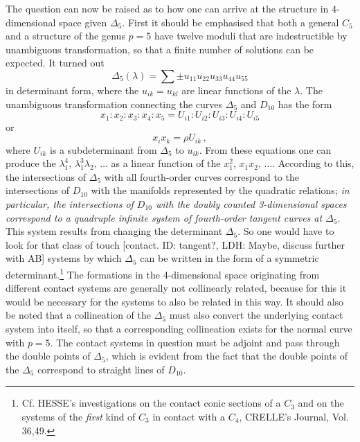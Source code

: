 \documentclass[leqno]{article}
\begin{document}
 The question can now be raised as to how one can arrive at the structure in 4-dimensional space given $\Delta_5$. First it should be emphasised that both a general $C_5$ and a structure of the genus $p=5$ have twelve moduli that are indestructible by unambiguous transformation, so that a finite number of solutions can be expected. It turned out
\[
\Delta_5(\lambda) = \sum \pm u_{11} u_{22} u_{33} u_{44} u_{55}
\] 
in determinant form, where the $u_{ik}=u_{kl}$ are linear functions of the $\lambda$. The unambiguous transformation connecting the curves $\Delta_5$ and $D_{10}$ has the form 
\[
x_1 : x_2 : x_3 : x_4 : x_5 = U_{i1} : U_{i2} : U_{i3} : U_{i4} : U_{i5}
\] 
or 
\[
x_i x_k = \rho U_{ik} \, , 
\] 
where $U_{ik}$ is a subdeterminant from $\Delta_5$ to $u_{ik} $. From these equations one can produce the $\lambda_1^4$, $\lambda_1^3 \lambda_2, \, \dots$ as a linear function of the $x_1^2$, $x_1 x_2, \, \dots$. According to this, the intersections of $\Delta_5$ with all fourth-order curves correspond to the intersections of $D_{10}$ with the manifolds represented by the quadratic relations; \textit{in particular, the intersections of $D_{10}$ with the doubly counted 3-dimensional spaces correspond to a quadruple infinite system of fourth-order tangent curves at $\Delta_5$}. This system results from changing the determinant $\Delta_5$. So one would have to look for that class of touch [contact. ID: tangent?, LDH: Maybe, discuss further with AB] systems by which $\Delta_5$ can be written in the form of a symmetric determinant.\footnote{Cf. HESSE's investigations on the contact conic sections of a $C_3$ and on the systems of the \textit{first} kind of $C_3$ in contact with a $C_4$, CRELLE's Journal, Vol. 36,49.} The formations in the 4-dimensional space originating from different contact systems are generally not collinearly related, because for this it would be necessary for the systems to also be related in this way. It should also be noted that a collineation of the $\Delta_5$ must also convert the underlying contact system into itself, so that a corresponding collineation exists for the normal curve with $p=5$. The contact systems in question must be adjoint and pass through the double points of $\Delta_5$, which is evident from the fact that the double points of the $\Delta_5$ correspond to straight lines of $D_{10}$.
\end{document}
